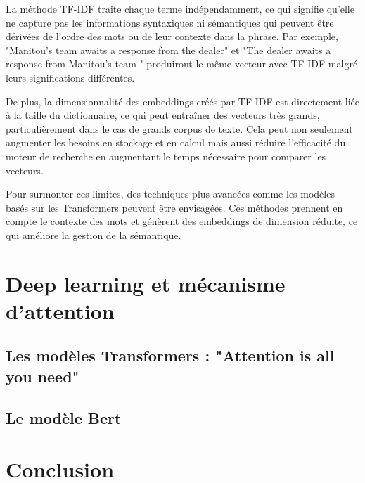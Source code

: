 \documentclass[12pt]{article}
\theoremstyle{definition}
\begin{document}
La méthode TF-IDF traite chaque terme indépendamment, ce qui signifie qu'elle ne capture pas les informations syntaxiques ni sémantiques qui peuvent être dérivées de l'ordre des mots ou de leur contexte dans la phrase. Par exemple, "Manitou's team awaits a response from the dealer" et "The dealer awaits a response from Manitou's team " produiront le même vecteur avec TF-IDF malgré leurs significations différentes. 

De plus, la dimensionnalité des embeddings créés par TF-IDF est directement liée à la taille du dictionnaire, ce qui peut entraîner des vecteurs très grands, particulièrement dans le cas de grands corpus de texte. Cela peut non seulement augmenter les besoins en stockage et en calcul mais aussi réduire l'efficacité du moteur de recherche en augmentant le temps nécessaire pour comparer les vecteurs.

Pour surmonter ces limites, des techniques plus avancées comme les modèles basés sur les Transformers peuvent être envisagées. Ces méthodes prennent en compte le contexte des mots et génèrent des embeddings de dimension réduite, ce qui améliore la gestion de la sémantique.


\section{Deep learning et mécanisme d'attention}

\subsection{Les modèles Transformers : "Attention is all you need"}
\subsection{Le modèle Bert}


\section{Conclusion}



	
\end{document}
